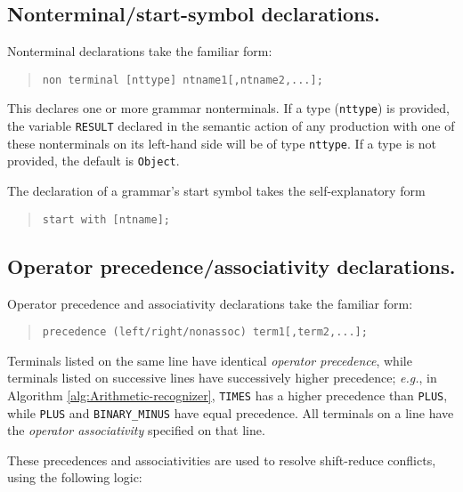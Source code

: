\documentclass[12pt,english,twoside]{report}
\begin{document}
\subsection{Nonterminal/start-symbol declarations.}

Nonterminal declarations take the familiar form:

\begin{quote}
\texttt{non terminal {[}nttype] ntname1{[},ntname2,...];}
\end{quote}
This declares one or more grammar nonterminals. If a type (\texttt{nttype})
is provided, the variable \texttt{RESULT} declared in the semantic
action of any production with one of these nonterminals on its left-hand
side will be of type \texttt{nttype}. If a type is not provided, the
default is \texttt{Object}.

The declaration of a grammar's start symbol takes the self-explanatory
form

\begin{quote}
\texttt{start with {[}ntname];}
\end{quote}

\subsection{Operator precedence/associativity declarations.}

Operator precedence and associativity declarations take the familiar
form:

\begin{quote}
\texttt{precedence (left/right/nonassoc) term1{[},term2,...];}
\end{quote}
Terminals listed on the same line have identical \emph{operator precedence},
while terminals listed on successive lines have successively higher
precedence; \emph{e.g.}, in Algorithm \ref{alg:Arithmetic-recognizer},
\texttt{TIMES} has a higher precedence than \texttt{PLUS}, while \texttt{PLUS}
and \texttt{BINARY\_MINUS} have equal precedence. All terminals on
a line have the \emph{operator associativity} specified on that line.

These precedences and associativities are used to resolve shift-reduce
conflicts, using the following logic:
\end{document}
